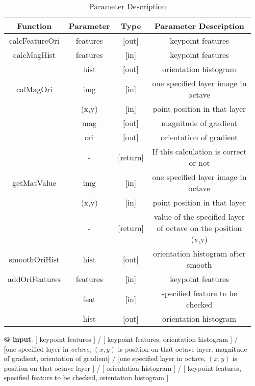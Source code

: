 \documentclass[paper=a4, fontsize=11pt]{scrartcl} %
\numberwithin{equation}{section} %
\numberwithin{figure}{section} %
\numberwithin{table}{section} %
\begin{document}
\begin{table}[h]
    \centering
    \begin{tabular}{|c|c|c|c|}
        \hline
        \textbf{Function} & \textbf{Parameter} & \textbf{Type} & \textbf{Parameter Description} \\\hline
        calcFeatureOri & features & [out] & keypoint features \\\hline
        calcMagHist & features & [in] & keypoint features \\
                        & hist & [out] & orientation histogram \\\hline
        calMagOri & img & [in] & one specified layer image in octave \\
                  & (x,y) & [in] & point position in that layer \\
                  & mag & [out] & magnitude of gradient \\
                  & ori & [out] & orientation of gradient \\
                        & - &[return] & If this calculation is correct or not \\\hline
        getMatValue & img & [in] & one specified layer image in octave \\
                  & (x,y) & [in] & point position in that layer \\
                        & - &[return] & value of the specified layer of octave on the position (x,y)\\\hline
        smoothOriHist & hist & [out] & orientation histogram after smooth \\\hline
        addOriFeatures & features & [in] & keypoint features \\
                       & feat & [in] & specified feature to be checked \\
        & hist & [out] & orientation histogram \\\hline
    \end{tabular}
    \caption{Parameter Description}\label{nolock}
\end{table}

\textbf{@ input}: [ keypoint features ] / [ keypoint features, orientation histogram ] / [one specified layer in \textsl{octave}, $(x,y)$ is position on that octave layer, magnitude of gradient, orientation of gradient] / [one specified layer in octave, $(x,y)$ is position on that octave layer ] / [ orientation histogram ] / [ keypoint features, specified feature to be checked, orientation histogram ]
\end{document}
